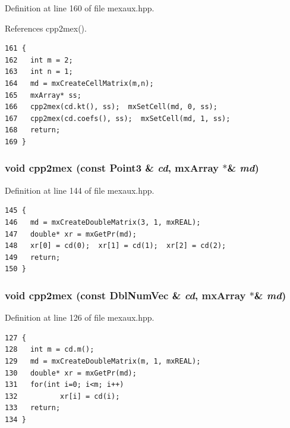 Definition at line 160 of file mexaux.hpp.

References cpp2mex().

\footnotesize\begin{verbatim}161 {
162   int m = 2;
163   int n = 1;
164   md = mxCreateCellMatrix(m,n);
165   mxArray* ss;
166   cpp2mex(cd.kt(), ss);  mxSetCell(md, 0, ss);
167   cpp2mex(cd.coefs(), ss);  mxSetCell(md, 1, ss);
168   return;
169 }
\end{verbatim}\normalsize 


\subsubsection{\setlength{\rightskip}{0pt plus 5cm}void cpp2mex (const Point3 \& {\em cd}, mx\-Array $\ast$\& {\em md})\hspace{0.3cm}{\tt  [inline]}}\label{mexaux_8hpp_55d0e49f10e34b3649825aebc7d9dbca_55d0e49f10e34b3649825aebc7d9dbca}




Definition at line 144 of file mexaux.hpp.

\footnotesize\begin{verbatim}145 {
146   md = mxCreateDoubleMatrix(3, 1, mxREAL);
147   double* xr = mxGetPr(md);
148   xr[0] = cd(0);  xr[1] = cd(1);  xr[2] = cd(2);
149   return;
150 }
\end{verbatim}\normalsize 


\subsubsection{\setlength{\rightskip}{0pt plus 5cm}void cpp2mex (const Dbl\-Num\-Vec \& {\em cd}, mx\-Array $\ast$\& {\em md})\hspace{0.3cm}{\tt  [inline]}}\label{mexaux_8hpp_73768d453bf6cedd12acaa8425efb187_73768d453bf6cedd12acaa8425efb187}




Definition at line 126 of file mexaux.hpp.

\footnotesize\begin{verbatim}127 {
128   int m = cd.m();
129   md = mxCreateDoubleMatrix(m, 1, mxREAL);
130   double* xr = mxGetPr(md);
131   for(int i=0; i<m; i++)
132          xr[i] = cd(i);
133   return;
134 }
\end{verbatim}\normalsize 



